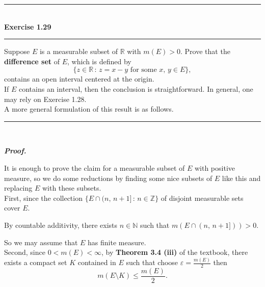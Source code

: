 \documentclass[a4paper,11pt]{article}
\begin{document}

\begin{flushleft}
	\rule[-0.5ex]{17cm}{2pt}\\
		\textbf{Exercise 1.29}\\
	\rule[1.5ex]{17cm}{0.5pt}
		Suppose $E$ is a measurable subset of $\mathbb{R}$ with $m(E) > 0$. Prove that the \textbf{difference set} of $E$, which is defined by
			$$\{z \in \mathbb{R}\,:\,z = x - y \text{ for some }x,\,y\in E\},$$
		contains an open interval centered at the origin.\\

		If $E$ contains an interval, then the conclusion is straightforward. In general, one may rely on Exercise 1.28.\\


		A more general formulation of this result is as follows.
	\rule[1.0ex]{17cm}{0.5pt}\
\end{flushleft}

\textbf{\textit{Proof.}}

It is enough to prove the claim for a measurable subset of $E$ with positive measure, so we do some reductions by finding some nice subsets of $E$ like this and replacing $E$ with these subsets.\\

First, since the collection $\{E \cap (n,\,n+1]\,:\,n\in \mathbb{Z}\}$ of disjoint measurable sets cover $E$.

By countable additivity, there exists $n \in \mathbb{N}$ such that $m(E \cap (n,\,n+1])) > 0$.

So we may assume that $E$ has finite measure.\\

Second, since $0 < m(E) < \infty$, by \textbf{Theorem 3.4 (iii)} of the textbook, there exists a compact set $K$ contained in $E$ such that choose $\varepsilon = \frac{m(E)}{2}$ then
	$$m(E \setminus K) \leq \frac{m(E)}{2}.$$
\end{document}
